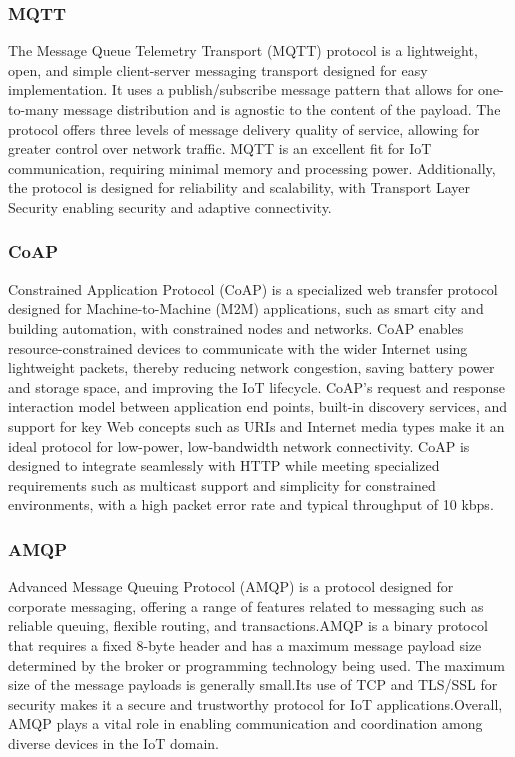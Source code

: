 \documentclass[12pt]{report}
\begin{document}
		\subsubsection*{MQTT}
The Message Queue Telemetry Transport (MQTT) protocol is a lightweight, open, and simple client-server messaging transport designed for easy implementation. It uses a publish/subscribe message pattern that allows for one-to-many message distribution and is agnostic to the content of the payload\cite{7446846}. The protocol offers three levels of message delivery quality of service, allowing for greater control over network traffic. MQTT is an excellent fit for IoT communication, requiring minimal memory and processing power. Additionally, the protocol is designed for reliability and scalability, with Transport Layer Security enabling security and adaptive connectivity.\cite{particleIoT}

			\subsubsection*{CoAP}
			Constrained Application Protocol (CoAP) is a specialized web transfer protocol designed for Machine-to-Machine (M2M) applications, such as smart city and building automation, with constrained nodes and networks.  CoAP enables resource-constrained devices to communicate with the wider Internet using lightweight packets, thereby reducing network congestion, saving battery power and storage space, and improving the IoT lifecycle.\cite{particleIoT}  CoAP's request and response interaction model between application end points, built-in discovery services, and support for key Web concepts such as URIs and Internet media types make it an ideal protocol for low-power, low-bandwidth network connectivity.  CoAP is designed to integrate seamlessly with HTTP while meeting specialized requirements such as multicast support and simplicity for constrained environments, with a high packet error rate and typical throughput of 10 kbps\cite{7446846}. 
				\subsubsection*{AMQP}
			Advanced Message Queuing Protocol (AMQP) is a protocol designed for corporate messaging, offering a range of features related to messaging such as reliable queuing, flexible routing, and transactions.\cite{8088251}AMQP is a binary protocol that requires a fixed 8-byte header and has a maximum message payload size determined by the broker or programming technology being used. The maximum size of the message payloads is generally small.\cite{7158101}Its use of TCP and TLS/SSL for security makes it a secure and trustworthy protocol for IoT applications\cite{han2015semantic}.Overall, AMQP plays a vital role in enabling communication and coordination among diverse devices in the IoT domain.
\end{document}
